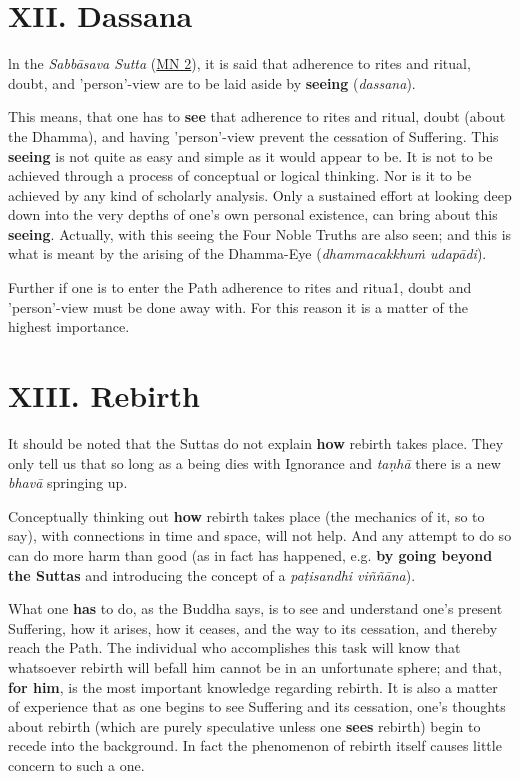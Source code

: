 \hypertarget{x-xii.-dassana}{\section*{XII. Dassana}}
ln the \emph{Sabbāsava Sutta} (\href{https://suttacentral.net/mn2/en/bodhi}{MN 2}), it is said that adherence to
rites and ritual, doubt, and 'person'-view are to be laid aside by \textbf{seeing} (\emph{dassana}).


This means, that one has to \textbf{see} that adherence to rites and ritual,
doubt (about the Dhamma), and having 'person'-view prevent the cessation
of Suffering. This \textbf{seeing} is not quite as easy and simple as it would
appear to be. It is not to be achieved through a process of conceptual
or logical thinking. Nor is it to be achieved by any kind of scholarly
analysis. Only a sustained effort at looking deep down into the very
depths of one’s own personal existence, can bring about this \textbf{seeing}.
Actually, with this seeing the Four Noble Truths are also seen; and this
is what is meant by the arising of the Dhamma-Eye (\emph{dhammacakkhuṁ udapādi}).


Further if one is to enter the Path adherence to rites and ritua1, doubt
and 'person'-view must be done away with. For this reason it is a
matter of the highest importance.


\hypertarget{x-xiii.-rebirth}{\section*{XIII. Rebirth}}
It should be noted that the Suttas do not explain \textbf{how} rebirth takes
place. They only tell us that so long as a being dies with Ignorance and
\emph{taṇhā} there is a new \emph{bhavā} springing up.


Conceptually thinking out \textbf{how} rebirth takes place (the mechanics of it,
so to say), with connections in time and space, will not help. And any
attempt to do so can do more harm than good (as in fact has happened,
e.g. \textbf{by going beyond the Suttas} and introducing the concept of a \emph{paṭisandhi viññāna}).


What one \textbf{has} to do, as the Buddha says, is to see
and understand one’s present Suffering, how it arises, how it ceases,
and the way to its cessation, and thereby reach the Path. The individual
who accomplishes this task will know that whatsoever rebirth will befall
him cannot be in an unfortunate sphere; and that, \textbf{for him}, is the most
important knowledge regarding rebirth. It is also a matter of experience
that as one begins to see Suffering and its cessation, one’s thoughts
about rebirth (which are purely speculative unless one \textbf{sees} rebirth)
begin to recede into the background. In fact the phenomenon of rebirth
itself causes little concern to such a one.


